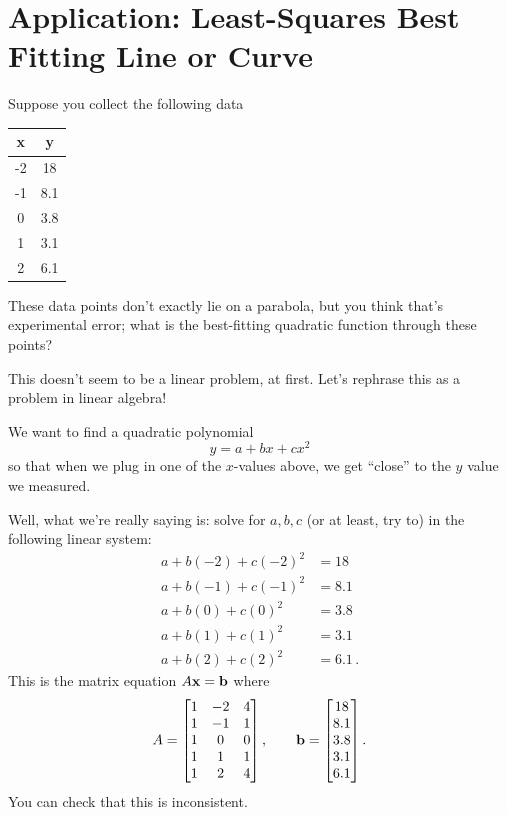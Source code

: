 \section{Application: Least-Squares Best Fitting Line or Curve}\label{leastsquares}

\begin{myprob} Suppose you collect the following data

\begin{center}
\begin{tabular}{|c|c|}
\hline x & y \\
\hline 
-2 & 18 \\
-1 &  8.1 \\
0 & 3.8\\
1 & 3.1\\
2 & 6.1\\
\hline
\end{tabular}
\end{center}
These data points don't exactly lie on a parabola, but you think that's
experimental error; what is the best-fitting quadratic function
through these points?

\medskip

\begin{mysol} 
This doesn't seem to be a linear problem, at first.
Let's rephrase this as a problem in linear algebra!

We want to find a quadratic polynomial
$$
y = a + bx + cx^2
$$
so that when we plug in one of the $x$-values above, we get ``close''
to the $y$ value we measured.

Well, what we're really saying is:  solve for $a,b,c$ (or at least,
try to) in the following linear system:
\begin{align*}
a + b(-2) + c(-2)^2 &= 18\\
a + b(-1) + c(-1)^2 &= 8.1\\
a + b(0) + c(0)^2 &= 3.8\\
a + b(1) + c(1)^2 &= 3.1\\
a+ b(2) + c(2)^2 &= 6.1\,.
\end{align*}
This is the matrix equation
$
A\mathbf{x} = \mathbf{b}
$
where 
$$
A = \left[ \begin{matrix} 1 & -2 & 4\\ 1 & -1 & 1\\ 1 & 0 & 0 \\ 1 &  1& 1\\ 1 & 2 & 4 \end{matrix} \right], \qquad \mathbf{b} = \left[ \begin{matrix} 18\\8.1\\3.8\\3.1\\6.1 \end{matrix} \right].
$$
You can check that this is inconsistent.


\end{mysol}
\end{myprob}
